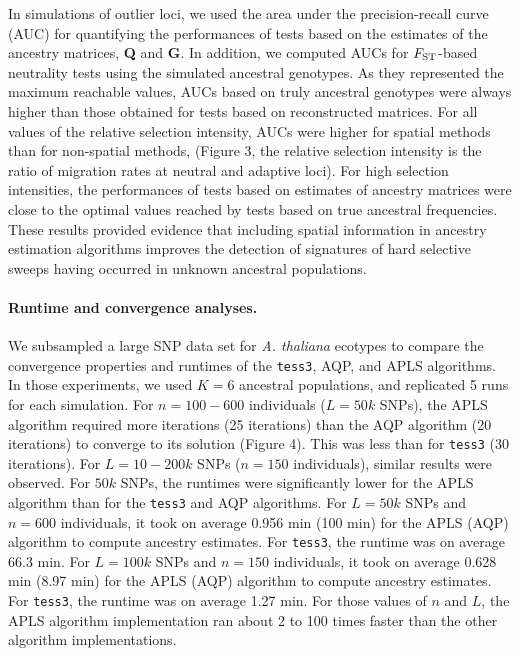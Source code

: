 In simulations of outlier loci, we used the area under the precision-recall curve (AUC) for quantifying the performances of tests based on the estimates of the ancestry matrices, {\bf Q} and {\bf G}. In addition, we computed AUCs for $F_{\rm ST}$-based neutrality tests using the simulated ancestral genotypes. As they represented the maximum reachable values, AUCs based on truly ancestral genotypes were always higher than those obtained for tests based on reconstructed matrices. For all values of the relative  selection intensity, AUCs were higher for spatial methods than for non-spatial methods, (Figure 3, the relative selection intensity is the ratio of migration rates at neutral and adaptive loci). For high selection intensities, the performances of tests based on estimates of ancestry matrices were close to the optimal values reached  by tests based on true ancestral frequencies. These results provided evidence that including spatial information in ancestry estimation algorithms improves the detection of signatures of hard selective sweeps having occurred in unknown ancestral populations. 

\paragraph{Runtime and convergence analyses.} We subsampled a large SNP data set for {\it A. thaliana} ecotypes  to compare the convergence properties and runtimes of the {\tt tess3}, AQP, and APLS algorithms. In those experiments, we used $K = 6$ ancestral populations, and replicated 5 runs for each simulation. For $n = 100-600$ individuals ($L = 50k$ SNPs), the APLS algorithm required more iterations (25 iterations)  than the AQP algorithm (20 iterations) to converge to its solution  (Figure 4). This was less than for {\tt tess3} (30 iterations).  For $L = 10-200k$ SNPs ($n = 150$ individuals), similar results were observed. For $50k$ SNPs, the runtimes were significantly lower for the APLS algorithm than for the {\tt tess3} and AQP algorithms. For $L = 50k$ SNPs and $n = 600$ individuals, it took on average 0.956 min (100 min) for the APLS (AQP) algorithm to compute ancestry estimates. For {\tt tess3}, the runtime was on average 66.3 min. For $L = 100k$ SNPs and $n = 150$ individuals, it took on average 0.628 min (8.97 min) for the APLS (AQP) algorithm to compute ancestry estimates. For {\tt tess3}, the runtime was on average 1.27 min.  For those values of $n$ and $L$, the APLS algorithm implementation ran about 2 to 100 times faster than the other algorithm implementations.
 
